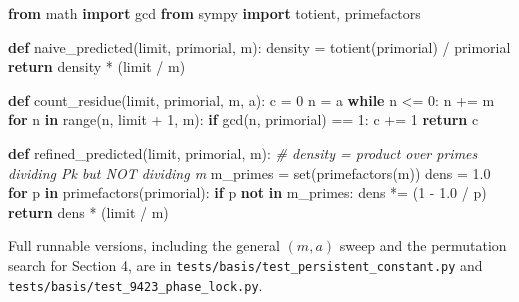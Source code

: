 \documentclass[
]{article}
\newenvironment{Shaded}{}{}
\newcommand{\BuiltInTok}[1]{\textcolor[rgb]{0.00,0.50,0.00}{#1}}
\newcommand{\CommentTok}[1]{\textcolor[rgb]{0.38,0.63,0.69}{\textit{#1}}}
\newcommand{\ControlFlowTok}[1]{\textcolor[rgb]{0.00,0.44,0.13}{\textbf{#1}}}
\newcommand{\DecValTok}[1]{\textcolor[rgb]{0.25,0.63,0.44}{#1}}
\newcommand{\FloatTok}[1]{\textcolor[rgb]{0.25,0.63,0.44}{#1}}
\newcommand{\ImportTok}[1]{\textcolor[rgb]{0.00,0.50,0.00}{\textbf{#1}}}
\newcommand{\KeywordTok}[1]{\textcolor[rgb]{0.00,0.44,0.13}{\textbf{#1}}}
\newcommand{\NormalTok}[1]{#1}
\newcommand{\OperatorTok}[1]{\textcolor[rgb]{0.40,0.40,0.40}{#1}}
\begin{document}
\begin{Shaded}
\begin{Highlighting}[]
\ImportTok{from}\NormalTok{ math }\ImportTok{import}\NormalTok{ gcd}
\ImportTok{from}\NormalTok{ sympy }\ImportTok{import}\NormalTok{ totient, primefactors}

\KeywordTok{def}\NormalTok{ naive\_predicted(limit, primorial, m):}
\NormalTok{    density }\OperatorTok{=}\NormalTok{ totient(primorial) }\OperatorTok{/}\NormalTok{ primorial}
    \ControlFlowTok{return}\NormalTok{ density }\OperatorTok{*}\NormalTok{ (limit }\OperatorTok{/}\NormalTok{ m)}

\KeywordTok{def}\NormalTok{ count\_residue(limit, primorial, m, a):}
\NormalTok{    c }\OperatorTok{=} \DecValTok{0}
\NormalTok{    n }\OperatorTok{=}\NormalTok{ a}
    \ControlFlowTok{while}\NormalTok{ n }\OperatorTok{\textless{}=} \DecValTok{0}\NormalTok{:}
\NormalTok{        n }\OperatorTok{+=}\NormalTok{ m}
    \ControlFlowTok{for}\NormalTok{ n }\KeywordTok{in} \BuiltInTok{range}\NormalTok{(n, limit }\OperatorTok{+} \DecValTok{1}\NormalTok{, m):}
        \ControlFlowTok{if}\NormalTok{ gcd(n, primorial) }\OperatorTok{==} \DecValTok{1}\NormalTok{:}
\NormalTok{            c }\OperatorTok{+=} \DecValTok{1}
    \ControlFlowTok{return}\NormalTok{ c}

\KeywordTok{def}\NormalTok{ refined\_predicted(limit, primorial, m):}
    \CommentTok{\# density = product over primes dividing Pk but NOT dividing m}
\NormalTok{    m\_primes }\OperatorTok{=} \BuiltInTok{set}\NormalTok{(primefactors(m))}
\NormalTok{    dens }\OperatorTok{=} \FloatTok{1.0}
    \ControlFlowTok{for}\NormalTok{ p }\KeywordTok{in}\NormalTok{ primefactors(primorial):}
        \ControlFlowTok{if}\NormalTok{ p }\KeywordTok{not} \KeywordTok{in}\NormalTok{ m\_primes:}
\NormalTok{            dens }\OperatorTok{*=}\NormalTok{ (}\DecValTok{1} \OperatorTok{{-}} \FloatTok{1.0} \OperatorTok{/}\NormalTok{ p)}
    \ControlFlowTok{return}\NormalTok{ dens }\OperatorTok{*}\NormalTok{ (limit }\OperatorTok{/}\NormalTok{ m)}
\end{Highlighting}
\end{Shaded}

Full runnable versions, including the general \((m,a)\) sweep and the
permutation search for Section 4, are in
\texttt{tests/basis/test\_persistent\_constant.py} and
\texttt{tests/basis/test\_9423\_phase\_lock.py}.
\end{document}
